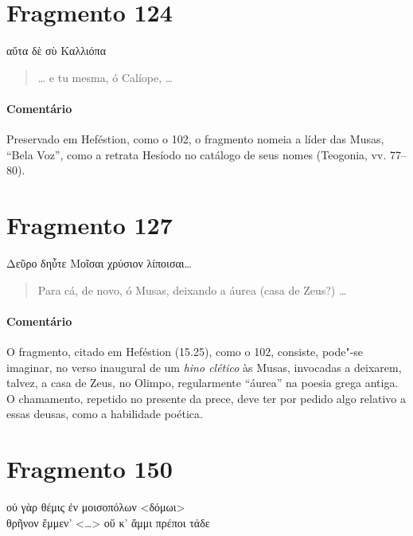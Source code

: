 {\section{Fragmento 124}

\begin{gkverse}
αὔτα δὲ σὺ Καλλιόπα
\end{gkverse}

\begin{verse}
\ldots{} e tu mesma, ó Calíope, \ldots{}
\end{verse}

{\paragraph{Comentário} Preservado em Heféstion, como o 102, o fragmento nomeia a líder das Musas, ``Bela Voz'', como a retrata Hesíodo no catálogo de seus nomes (Teogonia, vv. 77--80).}



\pagebreak
\section{Fragmento 127}

\begin{gkverse}
Δεῦρο δηὖτε Μοῖσαι χρύσιον λίποισαι\ldots{}
\end{gkverse}

\begin{verse}
Para cá, de novo, ó Musas, deixando a áurea (casa de Zeus?) \ldots{}
\end{verse}

{\paragraph{Comentário} O fragmento, citado em Heféstion (15.25), como o 102, consiste, pode"-se imaginar, no
verso inaugural de um \textit{hino clético }às Musas, invocadas a deixarem,
talvez, a casa de Zeus, no Olimpo, regularmente ``áurea''
na poesia grega antiga. O chamamento, repetido no presente da prece, deve ter
por pedido algo relativo a essas deusas, como a habilidade poética.}

\pagebreak
\section{Fragmento 150}

\begin{gkverse}
οὐ γὰρ θέμις ἐν μοισοπόλων <δόμωι>\\
θρῆνον ἔμμεν’ <\ldots{}> οὔ κ’ ἄμμι πρέποι τάδε
\end{gkverse}

}
